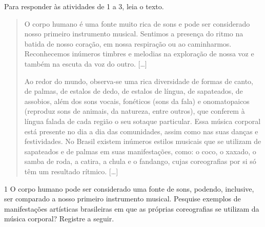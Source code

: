 
Para responder às atividades de 1 a 3, leia o texto.

\begin{quote}
O corpo humano é uma fonte muito rica de sons e pode ser considerado
nosso primeiro instrumento musical. Sentimos a presença do ritmo na
batida de nosso coração, em nossa respiração ou ao caminharmos.
Reconhecemos inúmeros timbres e melodias na exploração de nossa voz e
também na escuta da voz do outro. {[}\ldots{}{]}

Ao redor do mundo, observa-se uma rica diversidade de formas de canto,
de palmas, de estalos de dedo, de estalos de língua, de sapateados, de
assobios, além dos sons vocais, fonéticos (sons da fala) e onomatopaicos
(reproduz sons de animais, da natureza, entre outros), que conferem à
língua falada de cada região o seu sotaque particular. Essa música
corporal está presente no dia a dia das comunidades, assim como nas suas
danças e festividades. No Brasil existem inúmeros estilos musicais que
se utilizam de sapateados e de palmas em suas manifestações, como: o
coco, o xaxado, o samba de roda, a catira, a chula e o fandango, cujas
coreografias por si só têm um resultado rítmico. {[}\ldots{}{]}

\end{quote}

\num{1}  O corpo humano pode ser considerado uma fonte de sons, podendo, inclusive, ser comparado a nosso primeiro instrumento musical. Pesquise exemplos de manifestações artísticas brasileiras
  em que as próprias coreografias se utilizam da música corporal? Registre a seguir.



